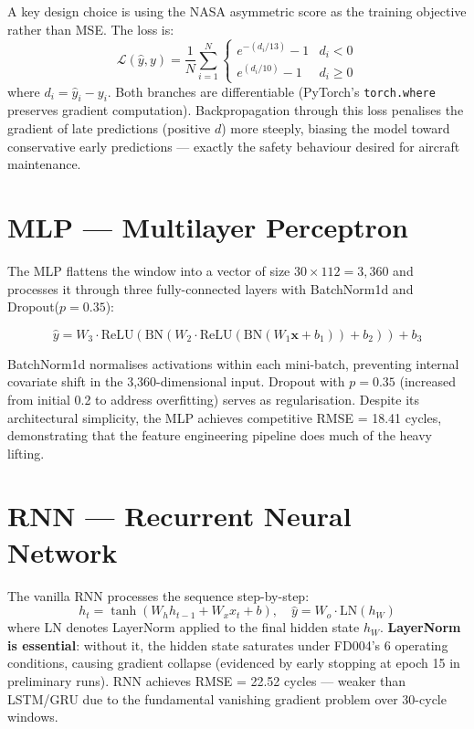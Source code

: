 \documentclass[12pt,a4paper]{report}
\begin{document}
A key design choice is using the NASA asymmetric score as the training objective rather than MSE. The loss is:
\[
\mathcal{L}(\hat{y}, y) = \frac{1}{N} \sum_{i=1}^{N} \begin{cases} e^{-(d_i/13)} - 1 & d_i < 0 \\ e^{(d_i/10)} - 1 & d_i \geq 0 \end{cases}
\]
where $d_i = \hat{y}_i - y_i$. Both branches are differentiable (PyTorch's \texttt{torch.where} preserves gradient computation). Backpropagation through this loss penalises the gradient of late predictions (positive $d$) more steeply, biasing the model toward conservative early predictions — exactly the safety behaviour desired for aircraft maintenance.

\section{MLP — Multilayer Perceptron}

The MLP flattens the window into a vector of size $30 \times 112 = 3{,}360$ and processes it through three fully-connected layers with BatchNorm1d and Dropout($p=0.35$):

\[
\hat{y} = W_3 \cdot \text{ReLU}(\text{BN}(W_2 \cdot \text{ReLU}(\text{BN}(W_1 \mathbf{x} + b_1)) + b_2)) + b_3
\]

BatchNorm1d normalises activations within each mini-batch, preventing internal covariate shift in the 3{,}360-dimensional input. Dropout with $p=0.35$ (increased from initial 0.2 to address overfitting) serves as regularisation. Despite its architectural simplicity, the MLP achieves competitive RMSE = 18.41 cycles, demonstrating that the feature engineering pipeline does much of the heavy lifting.

\section{RNN — Recurrent Neural Network}

The vanilla RNN processes the sequence step-by-step:
\[
h_t = \tanh(W_h h_{t-1} + W_x x_t + b), \quad \hat{y} = W_o \cdot \text{LN}(h_{W})
\]
where LN denotes LayerNorm applied to the final hidden state $h_W$. \textbf{LayerNorm is essential}: without it, the hidden state saturates under FD004's 6 operating conditions, causing gradient collapse (evidenced by early stopping at epoch 15 in preliminary runs). RNN achieves RMSE = 22.52 cycles — weaker than LSTM/GRU due to the fundamental vanishing gradient problem over 30-cycle windows.
\end{document}
